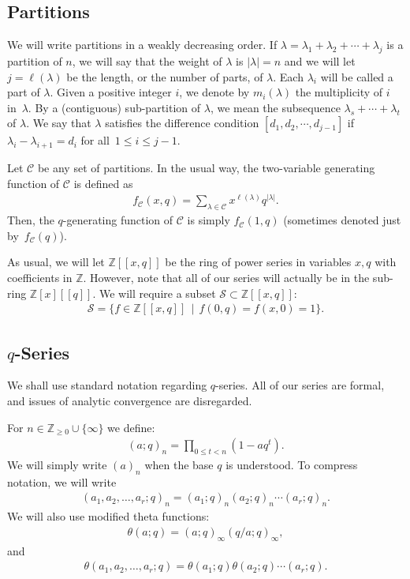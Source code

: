 \documentclass[ALCO,Unicode,published]{cedram}
\newcommand{\ZZ}{\mathbb{Z}}
\newcommand{\sC}{\mathscr{C}}
\newcommand{\sS}{\mathscr{S}}
\begin{document}
\subsection{Partitions}
We will write partitions in a weakly decreasing order. If $\lambda=\lambda_1+\lambda_2+\cdots +\lambda_j$ is a partition of $n$, 
we will say that the weight of $\lambda$ is $|\lambda|=n$ and 
we will let $j=\ell(\lambda)$ be the length, or the number of parts, of $\lambda$. 
Each $\lambda_i$ will be called a part of $\lambda$.
Given a positive integer $i$,
we denote by $m_i(\lambda)$ the multiplicity of $i$ in~$\lambda$. 
By a (contiguous) sub-partition of $\lambda$, we mean the subsequence
$\lambda_s+\cdots+\lambda_t$ of $\lambda$.
We say that $\lambda$ satisfies the difference condition $[d_1,d_2,\cdots,d_{j-1}]$ if $\lambda_i-\lambda_{i+1}=d_i$ for all~$1\leq i\leq j-1$.

Let $\sC$ be any set of partitions. In the usual way, the two-variable generating function of $\sC$ is defined as
\begin{align}
f_{\sC}(x,q)=\sum_{\lambda\in\sC}x^{\ell(\lambda)}q^{|\lambda|}.
\end{align}
Then, the $q$-generating function of $\sC$ is simply $f_{\sC}(1,q)$ (sometimes denoted just by~$f_{\sC}(q)$).

As usual, we will let $\ZZ[[x,q]]$ be the ring of power series in variables $x,q$ with coefficients in $\ZZ$. However, note that all of our series will actually be in the sub-ring $\ZZ[x][[q]]$. 
We will require a subset $\sS\subset \ZZ[[x,q]]$:
\begin{align}
	\sS = \{ f\in \ZZ[[x,q]]\,\mid\, f(0,q)=f(x,0)=1\}
	\label{eqn:S}.
\end{align}
\subsection{\texorpdfstring{$q$-Series}{q-Series}}
We shall use standard notation regarding $q$-series. 
All of our series are formal, and issues of analytic convergence are disregarded.

For $n\in\ZZ_{\geq 0}\cup\{\infty\}$ we define:
\begin{align}
(a;q)_n=\prod_{0\leq t<n}(1-aq^{t}).
\end{align}
We will simply write $(a)_n$ when the base $q$ is understood.
To compress notation, we will write
\begin{align}
(a_1,a_2,\dots,a_r;q)_n=(a_1;q)_n(a_2;q)_n\cdots(a_r;q)_n.
\end{align}
We will also use modified theta functions:
\begin{align}
\theta(a;q)=(a;q)_\infty(q/a;q)_\infty,
\end{align}
and
\begin{align}
\theta(a_1,a_2,\dots,a_r;q)=\theta(a_1;q)\theta(a_2;q)\cdots(a_r;q).
\end{align}
\end{document}
